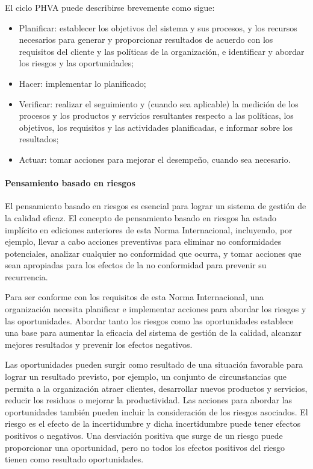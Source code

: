 		\par \noindent
			El ciclo PHVA puede describirse brevemente como sigue:
		\begin{itemize}
			\item Planificar: establecer los objetivos del sistema y sus procesos, y los recursos necesarios para
			generar y proporcionar resultados de acuerdo con los requisitos del cliente y las políticas de la
			organización, e identificar y abordar los riesgos y las oportunidades;
			
			\item Hacer: implementar lo planificado;
			
			\item Verificar: realizar el seguimiento y (cuando sea aplicable) la medición de los procesos y los productos
			y servicios resultantes respecto a las políticas, los objetivos, los requisitos y las actividades
			planificadas, e informar sobre los resultados;
			
			\item Actuar: tomar acciones para mejorar el desempeño, cuando sea necesario.
		\end{itemize}
		
	\paragraph{Pensamiento basado en riesgos}
		
		El pensamiento basado en riesgos es esencial para lograr un sistema de gestión de la calidad eficaz. El concepto de pensamiento basado en riesgos ha estado implícito en ediciones anteriores de esta Norma Internacional, incluyendo, por ejemplo, llevar a cabo acciones preventivas para eliminar no conformidades potenciales, analizar cualquier no conformidad que ocurra, y tomar acciones que sean apropiadas para los efectos de la no conformidad para prevenir su recurrencia.
		
		\par \noindent
			Para ser conforme con los requisitos de esta Norma Internacional, una organización necesita planificar
			e implementar acciones para abordar los riesgos y las oportunidades. Abordar tanto los riesgos como
			las oportunidades establece una base para aumentar la eficacia del sistema de gestión de la calidad,
			alcanzar mejores resultados y prevenir los efectos negativos.
		
		\par \noindent
			Las oportunidades pueden surgir como resultado de una situación favorable para lograr un resultado
			previsto, por ejemplo, un conjunto de circunstancias que permita a la organización atraer clientes,
			desarrollar nuevos productos y servicios, reducir los residuos o mejorar la productividad. Las acciones
			para abordar las oportunidades también pueden incluir la consideración de los riesgos asociados. El
			riesgo es el efecto de la incertidumbre y dicha incertidumbre puede tener efectos positivos o negativos. Una desviación positiva que surge de un riesgo puede proporcionar una oportunidad, pero no todos los efectos positivos del riesgo tienen como resultado oportunidades.
			
\newpage
\thispagestyle{plain}